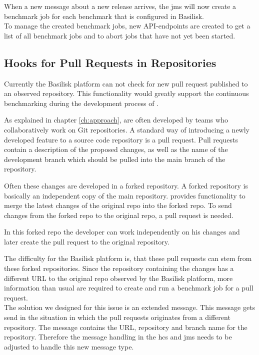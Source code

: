 When a new message about a new release arrives, the \ac{jms} will now create a benchmark job for each benchmark that is configured in Basilisk.
\\

To manage the created benchmark jobs, new API-endpoints are created to get a list of all benchmark jobs and to abort jobs that have not yet been started.


\subsection{Hooks for Pull Requests in \gh{} Repositories}
\label{sec:pullrequests_hcs_design}
Currently the Basilisk platform can not check for new pull request published to an observed repository.
This functionality would greatly support the continuous benchmarking during the development process of \tsp{}.

As explained in chapter \ref{ch:approach}, \tsp{} are often developed by teams who collaboratively work on Git repositories.
A standard way of introducing a newly developed feature to a source code repository is a pull request.
Pull requests contain a description of the proposed changes, as well as the name of the development branch which should be pulled into the main branch of the repository.

Often these changes are developed in a forked repository.
A forked repository is basically an independent copy of the main repository.
\gh{} provides functionality to merge the latest changes of the original repo into the forked repo.
To send changes from the forked repo to the original repo, a pull request is needed.

In this forked repo the developer can work independently on his changes and later create the pull request to the original repository.

The difficulty for the Basilisk platform is, that these pull requests can stem from these forked repositories.
Since the repository containing the changes has a different URL to the original repo observed by the Basilisk platform, more information than usual are required to create and run a benchmark job for a pull request.
\\

The solution we designed for this issue is an extended message.
This message gets send in the situation in which the pull requests originates from a different repository.
The message contains the URL, repository and branch name for the \gh{} repository.
Therefore the message handling in the \ac{hcs} and \ac{jms} needs to be adjusted to handle this new message type.

